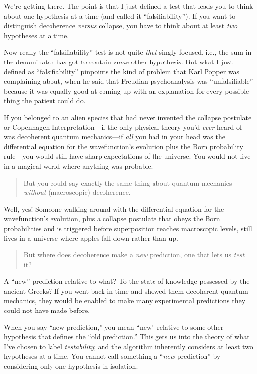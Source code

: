 {
 We're getting there. The point is that I just
defined a test that leads you to think about one hypothesis at a time
(and called it ``falsifiability'').
If you want to distinguish decoherence \textit{versus} collapse, you
have to think about at least \textit{two} hypotheses at a time.}

{
 Now really the
``falsifiability'' test is not quite
\textit{that} singly focused, i.e., the sum in the denominator has got
to contain \textit{some} other hypothesis. But what I just defined as
``falsifiability'' pinpoints the
kind of problem that Karl Popper was complaining about, when he said
that Freudian psychoanalysis was
``unfalsifiable'' because it was
equally good at coming up with an explanation for every possible thing
the patient could do.}

{
 If you belonged to an alien species that had never invented the
collapse postulate or Copenhagen Interpretation---if the only physical
theory you'd \textit{ever} heard of was decoherent
quantum mechanics---if \textit{all} you had in your head was the
differential equation for the wavefunction's evolution
plus the Born probability rule---you would still have sharp
expectations of the universe. You would not live in a magical world
where anything was probable.}

\begin{quote}
{
 But you could say exactly the same thing about quantum mechanics
\textit{without} (macroscopic) decoherence.}
\end{quote}

{
 Well, yes! Someone walking around with the differential equation
for the wavefunction's evolution, plus a collapse
postulate that obeys the Born probabilities and is triggered before
superposition reaches macroscopic levels, still lives in a universe
where apples fall down rather than up.}

\begin{quote}
{
 But where does decoherence make a \textit{new} prediction, one
 that lets us \textit{test} it?}
\end{quote}

{
 A ``new'' prediction relative
to what? To the state of knowledge possessed by the ancient Greeks? If
you went back in time and showed them decoherent quantum mechanics,
they would be enabled to make many experimental predictions they could
not have made before.}

{
 When you say ``new
prediction,'' you mean
``new'' relative to some other
hypothesis that defines the ``old
prediction.'' This gets us into the theory of what
I've chosen to label \textit{testability}; and the
algorithm inherently considers at least two hypotheses at a time. You
cannot call something a ``\textit{new}
prediction'' by considering only one hypothesis in
isolation.}

